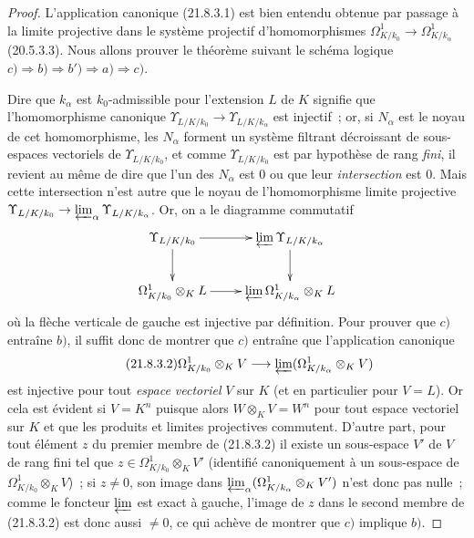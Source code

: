 \begin{proof}
L'application canonique (21.8.3.1) est bien entendu obtenue par passage à la
limite projective dans le système projectif d'homomorphismes
$\Omega^1_{K/k_0}\to\Omega^1_{K/k_\alpha}$ (20.5.3.3). Nous allons prouver
le théorème suivant le schéma logique $c)\Rightarrow b)\Rightarrow b')
\Rightarrow a)\Rightarrow c)$.

Dire que $k_\alpha$ est $k_0$-admissible pour l'extension $L$ de $K$ signifie
que l'homomorphisme
canonique $\Upsilon_{L/K/k_0}\to\Upsilon_{L/K/k_\alpha}$ est injectif~; or,
si $N_\alpha$ est le noyau de cet homomorphisme, les $N_\alpha$ forment un
système filtrant décroissant de sous-espaces vectoriels de
$\Upsilon_{L/K/k_0}$, et comme $\Upsilon_{L/K/k_0}$ est par hypothèse de rang
\emph{fini}, il revient au même de dire que l'un des $N_\alpha$ est $0$ ou que leur
\emph{intersection} est $0$. Mais cette intersection n'est autre que le noyau de
l'homomorphisme limite projective
$\Upsilon_{L/K/k_0}\to\varprojlim_\alpha\Upsilon_{L/K/k_\alpha}$. Or, on a
le diagramme commutatif
\[
\xymatrix{
\Upsilon_{L/K/k_0}\ar[r]\ar[d]&\varprojlim\Upsilon_{L/K/k_\alpha}\ar[d]\\
\Omega^1_{K/k_0}\otimes_KL\ar[r]&
\varprojlim\Omega^1_{K/k_\alpha}\otimes_KL
}
\]
où la flèche verticale de gauche est injective par définition. Pour prouver
que $c)$ entraîne $b)$, il suffit donc de montrer que $c)$ entraîne que l'application canonique
\begin{equation}
\tag{21.8.3.2}
\label{0.21.8.3.2-fr}
\Omega^1_{K/k_0}\otimes_KV\longrightarrow
\varprojlim(\Omega^1_{K/k_\alpha}\otimes_KV)
\end{equation}
est injective pour tout \emph{espace vectoriel} $V$ sur $K$ (et en particulier pour
$V=L$). Or cela est évident si $V=K^n$ puisque alors
$W\otimes_KV=W^n$ pour tout espace vectoriel sur $K$ et que les produits
et limites projectives commutent. D'autre part, pour tout élément $z$ du
premier membre de (21.8.3.2) il existe un sous-espace $V'$ de $V$ de rang
fini tel que $z\in\Omega^1_{K/k_0}\otimes_KV'$ (identifié canoniquement à un
sous-espace de $\Omega^1_{K/k_0}\otimes_KV$)~; si $z\ne0$, son image dans
$\varprojlim_\alpha(\Omega^1_{K/k_\alpha}\otimes_KV')$ n'est donc pas nulle~;
comme le foncteur $\varprojlim$ est exact à gauche, l'image de $z$ dans le
second membre de (21.8.3.2) est donc aussi $\ne0$, ce qui achève de montrer
que $c)$ implique $b)$.


\end{proof}
